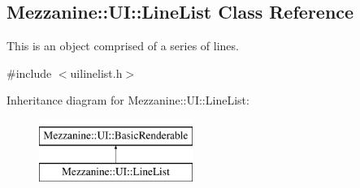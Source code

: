 \hypertarget{classMezzanine_1_1UI_1_1LineList}{
\subsection{Mezzanine::UI::LineList Class Reference}
\label{classMezzanine_1_1UI_1_1LineList}
}


This is an object comprised of a series of lines.  




{\ttfamily \#include $<$uilinelist.h$>$}

Inheritance diagram for Mezzanine::UI::LineList:\begin{figure}[H]
\begin{center}
\leavevmode
\includegraphics[height=2.000000cm]{classMezzanine_1_1UI_1_1LineList}
\end{center}
\end{figure}
